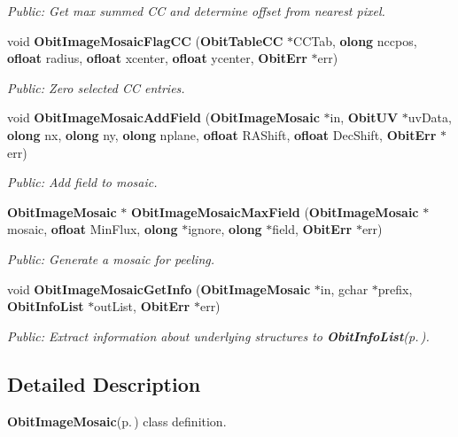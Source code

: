 \begin{CompactItemize}
\begin{CompactList}\small\item\em Public: Get max summed CC and determine offset from nearest pixel. \item\end{CompactList}\item 
void {\bf Obit\-Image\-Mosaic\-Flag\-CC} ({\bf Obit\-Table\-CC} $\ast$CCTab, {\bf olong} nccpos, {\bf ofloat} radius, {\bf ofloat} xcenter, {\bf ofloat} ycenter, {\bf Obit\-Err} $\ast$err)
\begin{CompactList}\small\item\em Public: Zero selected CC entries. \item\end{CompactList}\item 
void {\bf Obit\-Image\-Mosaic\-Add\-Field} ({\bf Obit\-Image\-Mosaic} $\ast$in, {\bf Obit\-UV} $\ast$uv\-Data, {\bf olong} nx, {\bf olong} ny, {\bf olong} nplane, {\bf ofloat} RAShift, {\bf ofloat} Dec\-Shift, {\bf Obit\-Err} $\ast$err)
\begin{CompactList}\small\item\em Public: Add field to mosaic. \item\end{CompactList}\item 
{\bf Obit\-Image\-Mosaic} $\ast$ {\bf Obit\-Image\-Mosaic\-Max\-Field} ({\bf Obit\-Image\-Mosaic} $\ast$mosaic, {\bf ofloat} Min\-Flux, {\bf olong} $\ast$ignore, {\bf olong} $\ast$field, {\bf Obit\-Err} $\ast$err)
\begin{CompactList}\small\item\em Public: Generate a mosaic for peeling. \item\end{CompactList}\item 
void {\bf Obit\-Image\-Mosaic\-Get\-Info} ({\bf Obit\-Image\-Mosaic} $\ast$in, gchar $\ast$prefix, {\bf Obit\-Info\-List} $\ast$out\-List, {\bf Obit\-Err} $\ast$err)
\begin{CompactList}\small\item\em Public: Extract information about underlying structures to {\bf Obit\-Info\-List}{\rm (p.\,\pageref{structObitInfoList})}. \item\end{CompactList}\end{CompactItemize}


\subsection{Detailed Description}
{\bf Obit\-Image\-Mosaic}{\rm (p.\,\pageref{structObitImageMosaic})} class definition. 

